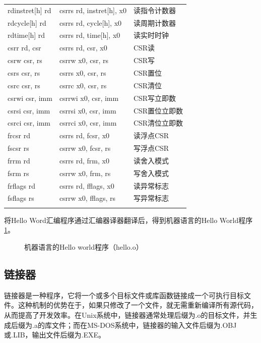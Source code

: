 \begin{longtable}{>{\centering\arraybackslash}p{5cm} >{\centering\arraybackslash}p{5.2cm} >{\centering\arraybackslash}p{5cm}}
	\midrule
	rdinstret[h] rd & csrrs rd, instret[h], x0          & 读指令计数器      \\
	rdcycle[h] rd   & csrrs rd, cycle[h], x0            & 读周期计数器      \\
	rdtime[h] rd    & csrrs rd, time[h], x0             & 读实时时钟       \\
	\midrule
	csrr rd, csr    & csrrs rd, csr, x0                 & CSR读        \\
	csrw csr, rs    & csrrw x0, csr, rs                 & CSR写        \\
	csrs csr, rs    & csrrs x0, csr, rs                 & CSR置位       \\
	csrc csr, rs    & csrrc x0, csr, rs                 & CSR清位       \\
	\midrule
	csrwi csr, imm  & csrrwi x0, csr, imm               & CSR写立即数     \\
	csrsi csr, imm  & csrrsi x0, csr, imm               & CSR置位立即数    \\
	csrci csr, imm  & csrrci x0, csr, imm               & CSR清位立即数    \\
	\midrule
	frcsr rd        & csrrs rd, fcsr, x0                & 读浮点CSR      \\
	fscsr rs        & csrrw x0, fcsr, rs                & 写浮点CSR      \\
	\midrule
	frrm rd         & csrrs rd, frm, x0                 & 读舍入模式       \\
	fsrm rs         & csrrw x0, frm, rs                 & 写舍入模式       \\
	\midrule
	frflags rd      & csrrs rd, fflags, x0              & 读异常标志       \\
	fsflags rs      & csrrw x0, fflags, rs              & 写异常标志       \\
	\label{tab:riscv_pseudoinstruction}
\end{longtable}


将Hello Word汇编程序通过汇编器译器翻译后，得到机器语言的Hello World程序\ref{fig:hello_o_example}。

\begin{figure}[htbp]
	\centering
	
	\caption{机器语言的Hello world程序（hello.o）}
	\label{fig:hello_o_example}
\end{figure}

\subsection{链接器}
链接器是一种程序，它将一个或多个目标文件或库函数链接成一个可执行目标文件。这种机制的优势在于，如果只修改了一个文件，就无需重新编译所有源代码，从而提高了开发效率。在Unix系统中，链接器通常处理后缀为.o的目标文件，并生成后缀为.a的库文件；而在MS-DOS系统中，链接器的输入文件后缀为.OBJ或.LIB，输出文件后缀为.EXE。

